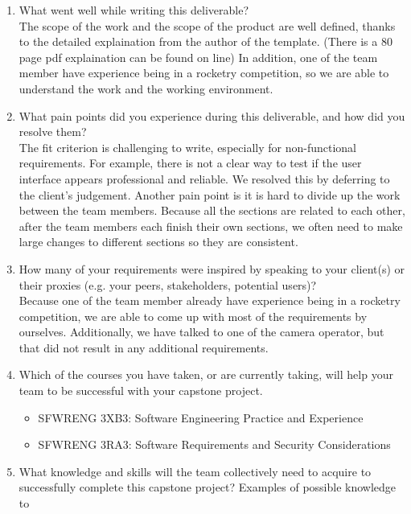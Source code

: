 \documentclass[12pt]{article}
\begin{document}
\begin{enumerate}
  \item What went well while writing this deliverable?\\[2mm] The scope of the work and the
        scope of the product are well defined, thanks to the detailed explaination from
        the author of the template. (There is a 80 page pdf explaination can be found
        on line) In addition, one of the team member have experience being in a
        rocketry competition, so we are able to understand the work and the working
        environment.
  \item What pain points did you experience during this deliverable, and how did you
        resolve them? \\[2mm] The fit criterion is challenging to write, especially for
        non-functional requirements. For example, there is not a clear way to test if
        the user interface appears professional and reliable. We resolved this by
        deferring to the client's judgement. Another pain point is it is hard to divide
        up the work between the team members. Because all the sections are related to
        each other, after the team members each finish their own sections, we often
        need to make large changes to different sections so they are consistent.
  \item How many of your requirements were inspired by speaking to your client(s) or
        their proxies (e.g. your peers, stakeholders, potential users)? \\[2mm] Because one
        of the team member already have experience being in a rocketry competition, we
        are able to come up with most of the requirements by ourselves. Additionally,
        we have talked to one of the camera operator, but that did not result in any
        additional requirements.
  \item Which of the courses you have taken, or are currently taking, will help your
        team to be successful with your capstone project.
        \begin{itemize}
          \item SFWRENG 3XB3: Software Engineering Practice and Experience
          \item SFWRENG 3RA3: Software Requirements and Security Considerations
        \end{itemize}
  \item What knowledge and skills will the team collectively need to acquire to
        successfully complete this capstone project? Examples of possible knowledge to

\end{enumerate}
\end{document}
